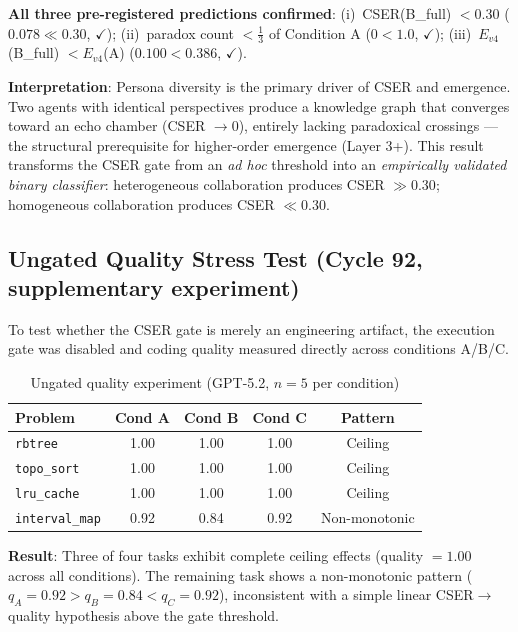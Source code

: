 \documentclass[12pt]{article}
\begin{document}
\noindent\textbf{All three pre-registered predictions confirmed}:
(i)~CSER(B\_full) $< 0.30$ ($0.078 \ll 0.30$, $\checkmark$);
(ii)~paradox count $< \frac{1}{3}$ of Condition A ($0 < 1.0$, $\checkmark$);
(iii)~$E_{v4}$(B\_full) $< E_{v4}$(A) ($0.100 < 0.386$, $\checkmark$).

\noindent\textbf{Interpretation}: Persona diversity is the primary driver of CSER and
emergence. Two agents with identical perspectives produce a knowledge graph that
converges toward an echo chamber (CSER $\to 0$), entirely lacking paradoxical
crossings --- the structural prerequisite for higher-order emergence (Layer 3+).
This result transforms the CSER gate from an \emph{ad hoc} threshold into an
\emph{empirically validated binary classifier}: heterogeneous collaboration
produces CSER $\gg 0.30$; homogeneous collaboration produces CSER $\ll 0.30$.

\subsection{Ungated Quality Stress Test (Cycle 92, supplementary experiment)}

To test whether the CSER gate is merely an engineering artifact, the
execution gate was disabled and coding quality measured directly across conditions A/B/C.

\begin{table}[h!]
\centering
\caption{Ungated quality experiment (GPT-5.2, $n=5$ per condition)}
\label{tab:ungated_quality}
\begin{tabular}{lcccc}
\toprule
Problem & Cond A & Cond B & Cond C & Pattern \\
\midrule
\texttt{rbtree} & 1.00 & 1.00 & 1.00 & Ceiling \\
\texttt{topo\_sort} & 1.00 & 1.00 & 1.00 & Ceiling \\
\texttt{lru\_cache} & 1.00 & 1.00 & 1.00 & Ceiling \\
\texttt{interval\_map} & 0.92 & 0.84 & 0.92 & Non-monotonic \\
\bottomrule
\end{tabular}
\end{table}

\noindent\textbf{Result}: Three of four tasks exhibit complete ceiling effects
(quality $=1.00$ across all conditions). The remaining task shows a non-monotonic
pattern ($q_A=0.92 > q_B=0.84 < q_C=0.92$), inconsistent with a simple linear
CSER$\rightarrow$quality hypothesis above the gate threshold.
\end{document}
